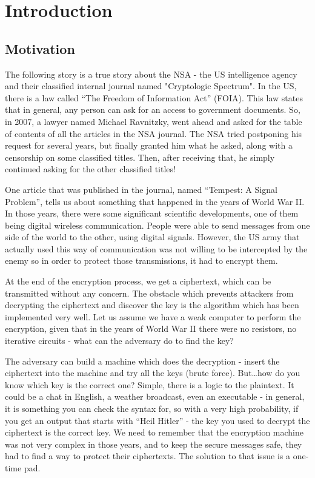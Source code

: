 \chapter{Introduction} \label{chap:c1_IntroductionAOI}

\section{Motivation} \label{sec:Motivation} %

The following story is a true story about the NSA - the US intelligence agency
and their classified internal journal named "Cryptologic Spectrum".
In the US, there is a law called ``The Freedom of Information Act'' (FOIA). This law states that in general, any person can ask for an access to government documents.
So, in 2007, a lawyer named Michael Ravnitzky, went ahead and asked for the table of
contents of all the articles in the NSA journal. The NSA tried postponing his request for several years, but finally granted him what he asked, along with a censorship on some classified titles. Then, after receiving that, he simply continued asking for the other classified titles!

One article that was published in the journal, named ``Tempest: A Signal Problem'',
tells us about something that happened in the years of World War II. In those years,
there were some significant scientific developments, one of them being digital wireless
communication. People were able to send messages from one side of the world to the other, using digital signals. However, the US army that actually used this way of communication was not willing to be intercepted by the enemy so in order to protect those transmissions, it had to encrypt them. 

At the end of the encryption process, we get a ciphertext, which can be
transmitted without any concern. The obstacle which prevents attackers from
decrypting the ciphertext and discover the key is the algorithm which has been
implemented very well. Let us assume we have a weak computer to perform the
encryption, given that in the years of World War II there were no resistors, no
iterative circuits - what can the adversary do to find the key?

The adversary can build a machine which does the decryption - insert the
ciphertext into the machine and try all the keys (brute force). But\ldots how do
you know which key is the correct one? Simple, there is a logic to the plaintext.
It could be a chat in English, a weather broadcast, even an executable - in general, it is
something you can check the syntax for, so with a very high probability, if you get
an output that starts with ``Heil Hitler'' -  the key you used to decrypt the
ciphertext is the correct key. We need to remember that the encryption machine
was not very complex in those years, and to keep the secure messages safe, they
had to find a way to protect their ciphertexts. The solution to that issue is a
one-time pad.

